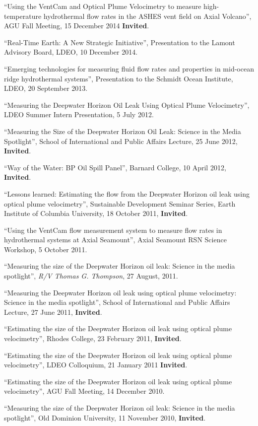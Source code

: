 \documentclass[11pt]{res}
\begin{document}
\begin{resume}
``Using the VentCam and Optical Plume Velocimetry to measure high-temperature hydrothermal flow rates in the ASHES vent field on Axial Volcano'', AGU Fall Meeting, 15 December 2014 {\bf Invited}.

``Real-Time Earth: A New Strategic Initiative'', Presentation to the Lamont Advisory Board, LDEO, 10 December 2014.

``Emerging technologies for measuring fluid flow rates and properties in mid-ocean ridge hydrothermal systems'', Presentation to the Schmidt Ocean Institute, LDEO, 20 September 2013.

``Measuring the Deepwater Horizon Oil Leak Using Optical Plume Velocimetry'', LDEO Summer Intern Presentation, 5 July 2012.

``Measuring the Size of the Deepwater Horizon Oil Leak: Science in the Media Spotlight'', School of International and Public Affairs Lecture, 25 June 2012, {\bf Invited}.

``Way of the Water: BP Oil Spill Panel'', Barnard College, 10 April 2012, {\bf Invited}.

``Lessons learned: Estimating the flow from the Deepwater Horizon oil leak using optical plume velocimetry'', Sustainable Development Seminar Series, Earth Institute of Columbia University, 18 October 2011, {\bf Invited}.

``Using the VentCam flow measurement system to measure flow rates in hydrothermal systems at Axial Seamount'', Axial Seamount RSN Science Workshop, 5 October 2011. 

``Measuring the size of the Deepwater Horizon oil leak: Science in the media spotlight'', {\em R/V Thomas G. Thompson}, 27 August, 2011.

``Measuring the Deepwater Horizon oil leak using optical plume velocimetry: Science in the media spotlight'', School of International and Public Affairs Lecture, 27 June 2011, {\bf Invited}.

``Estimating the size of the Deepwater Horizon oil leak using optical plume velocimetry'', Rhodes College, 23 February 2011, {\bf Invited}.

``Estimating the size of the Deepwater Horizon oil leak using optical plume velocimetry'', LDEO Colloquium, 21 January 2011 {\bf Invited}.

``Estimating the size of the Deepwater Horizon oil leak using optical plume velocimetry'', AGU Fall Meeting, 14 December 2010.

``Measuring the size of the Deepwater Horizon oil leak: Science in the media spotlight'', Old Dominion University, 11 November 2010, {\bf Invited}.


\end{resume}
\end{document}
